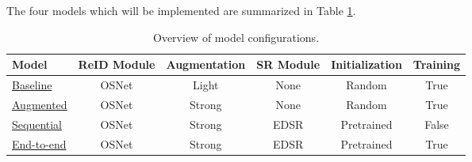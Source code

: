 \noindent The four models which will be implemented are summarized in Table \ref{tab:model_overview}.

\begin{table}[H]
\centering
\begin{tabular}{|l|c|c|c|c|c|}
\hline
\rowcolor[HTML]{D8E9F7}
\textbf{Model} & \textbf{\acs{ReID} Module} & \textbf{Augmentation} & \textbf{\acs{SR} Module} & \textbf{Initialization} & \textbf{Training} \\ \hline
\hyperlink{model:baseline}{Baseline}   & \acs{OSNet} & Light  & None       & Random     & True \\ \hline
\hyperlink{model:augmented}{Augmented} & \acs{OSNet} & Strong & None       & Random     & True \\ \hline
\hyperlink{model:sequential}{Sequential} & \acs{OSNet} & Strong & \acs{EDSR} & Pretrained & False \\ \hline
\hyperlink{model:endtoend}{End-to-end} & \acs{OSNet} & Strong & \acs{EDSR} & Pretrained & True \\ \hline
\end{tabular}
\caption{Overview of model configurations.}
\label{tab:model_overview}
\end{table}


